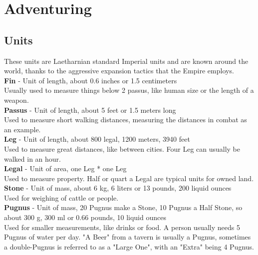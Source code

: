 \chapter{Adventuring}
\section{Units}
These units are Laetharnian standard Imperial units and are known around the world, thanks to the aggressive expansion tactics that the Empire employs.\\


\textbf{Fin} - Unit of length, about 0.6 inches or 1.5 centimeters\\
Usually used to measure things below 2 passus, like human size or the length of a weapon.\\


\textbf{Passus} - Unit of length, about 5 feet or 1.5 meters long\\
Used to measure short walking distances, measuring the distances in combat as an example.\\


\textbf{Leg} - Unit of length, about 800 legal, 1200 meters, 3940 feet\\
Used to measure great distances, like between cities. Four Leg can usually be walked in an hour.\\


\textbf{Legal} - Unit of area, one Leg * one Leg\\
Used to measure property. Half or quart a Legal are typical units for owned land.\\


\textbf{Stone} - Unit of mass, about 6 kg, 6 liters or 13 pounds, 200 liquid ounces\\
Used for weighing of cattle or people.\\


\textbf{Pugnus} - Unit of mass, 20 Pugnus make a Stone, 10 Pugnus a Half Stone, so about 300 g, 300 ml or 0.66 pounds, 10 liquid ounces\\
Used for smaller measurements, like drinks or food. A person usually needs 5 Pugnus of water per day. "A Beer" from a tavern is usually a Pugnus, sometimes a double-Pugnus is referred to as a  "Large One", with an "Extra" being 4 Pugnus.\\


